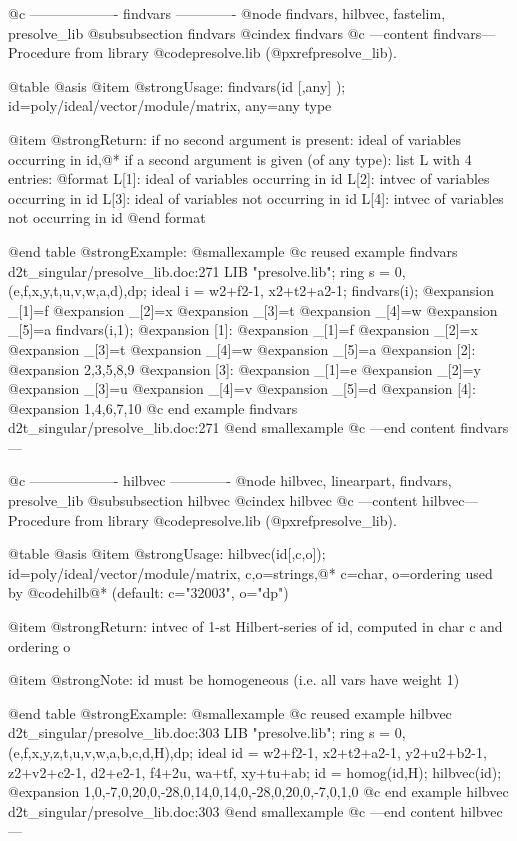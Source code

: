 @c ------------------- findvars -------------
@node findvars, hilbvec, fastelim, presolve_lib
@subsubsection findvars
@cindex findvars
@c ---content findvars---
Procedure from library @code{presolve.lib} (@pxref{presolve_lib}).

@table @asis
@item @strong{Usage:}
findvars(id [,any] ); id=poly/ideal/vector/module/matrix, any=any type

@item @strong{Return:}
if no second argument is present: ideal of variables occurring in id,@*
if a second argument is given (of any type): list L with 4 entries:
  @format
  L[1]: ideal of variables occurring in id
  L[2]: intvec of variables occurring in id
  L[3]: ideal of variables not occurring in id
  L[4]: intvec of variables not occurring in id
  @end format

@end table
@strong{Example:}
@smallexample
@c reused example findvars d2t_singular/presolve_lib.doc:271 
LIB "presolve.lib";
ring s  = 0,(e,f,x,y,t,u,v,w,a,d),dp;
ideal i = w2+f2-1, x2+t2+a2-1;
findvars(i);
@expansion{} _[1]=f
@expansion{} _[2]=x
@expansion{} _[3]=t
@expansion{} _[4]=w
@expansion{} _[5]=a
findvars(i,1);
@expansion{} [1]:
@expansion{}    _[1]=f
@expansion{}    _[2]=x
@expansion{}    _[3]=t
@expansion{}    _[4]=w
@expansion{}    _[5]=a
@expansion{} [2]:
@expansion{}    2,3,5,8,9
@expansion{} [3]:
@expansion{}    _[1]=e
@expansion{}    _[2]=y
@expansion{}    _[3]=u
@expansion{}    _[4]=v
@expansion{}    _[5]=d
@expansion{} [4]:
@expansion{}    1,4,6,7,10
@c end example findvars d2t_singular/presolve_lib.doc:271
@end smallexample
@c ---end content findvars---

@c ------------------- hilbvec -------------
@node hilbvec, linearpart, findvars, presolve_lib
@subsubsection hilbvec
@cindex hilbvec
@c ---content hilbvec---
Procedure from library @code{presolve.lib} (@pxref{presolve_lib}).

@table @asis
@item @strong{Usage:}
hilbvec(id[,c,o]); id=poly/ideal/vector/module/matrix, c,o=strings,@*
c=char, o=ordering used by @code{hilb}@*
(default: c="32003", o="dp")

@item @strong{Return:}
intvec of 1-st Hilbert-series of id, computed in char c and ordering o

@item @strong{Note:}
id must be homogeneous (i.e. all vars have weight 1)

@end table
@strong{Example:}
@smallexample
@c reused example hilbvec d2t_singular/presolve_lib.doc:303 
LIB "presolve.lib";
ring s   = 0,(e,f,x,y,z,t,u,v,w,a,b,c,d,H),dp;
ideal id = w2+f2-1, x2+t2+a2-1,  y2+u2+b2-1, z2+v2+c2-1,
d2+e2-1, f4+2u, wa+tf, xy+tu+ab;
id = homog(id,H);
hilbvec(id);
@expansion{} 1,0,-7,0,20,0,-28,0,14,0,14,0,-28,0,20,0,-7,0,1,0
@c end example hilbvec d2t_singular/presolve_lib.doc:303
@end smallexample
@c ---end content hilbvec---


